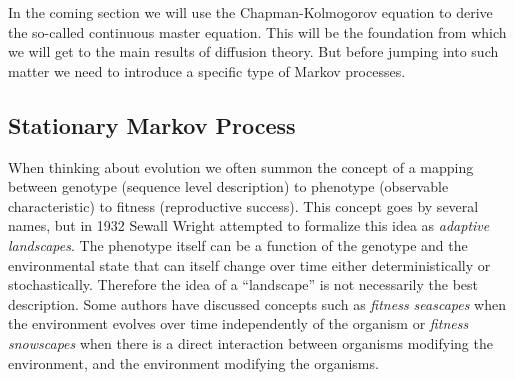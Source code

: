 In the coming section we will use the Chapman-Kolmogorov equation to derive the
so-called continuous master equation. This will be the foundation from which we
will get to the main results of diffusion theory. But before jumping into such
matter we need to introduce a specific type of Markov processes.

\subsection{Stationary Markov Process}\label{sec_stationary_process}

When thinking about evolution we often summon the concept of a mapping between
genotype (sequence level description) to phenotype (observable characteristic)
to fitness (reproductive success). This concept goes by several names, but in
1932 Sewall Wright attempted to formalize this idea as \textit{adaptive
landscapes}. The phenotype itself can be a function of the genotype and the
environmental state that can itself change over time either deterministically
or stochastically. Therefore the idea of a ``landscape'' is not necessarily the
best description. Some authors have discussed concepts such as \textit{fitness
seascapes} when the environment evolves over time independently of the organism
or \textit{fitness snowscapes} when there is a direct interaction between
organisms modifying the environment, and the environment modifying the
organisms.

